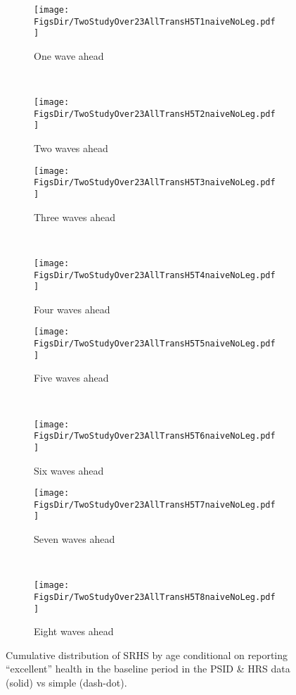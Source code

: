 \documentclass[12pt,pdftex,letterpaper]{article}
\newcommand{\RootDir}{..}
\newcommand{\FigsDir}{\RootDir/Figures}
\begin{document}
\begin{figure}
	\centering
	\begin{subfigure}[b]{0.45\textwidth}
		\texttt{[image: \\FigsDir/TwoStudyOver23AllTransH5T1naiveNoLeg.pdf]}
		\caption{One wave ahead}\label{fig:Naive1AheadExcellent}
	\end{subfigure}
	~
	\begin{subfigure}[b]{0.45\textwidth}
		\texttt{[image: \\FigsDir/TwoStudyOver23AllTransH5T2naiveNoLeg.pdf]}
		\caption{Two waves ahead}\label{fig:Naive2AheadExcellent}
	\end{subfigure}
	
	\begin{subfigure}[b]{0.45\textwidth}
		\texttt{[image: \\FigsDir/TwoStudyOver23AllTransH5T3naiveNoLeg.pdf]}
		\caption{Three waves ahead}\label{fig:Naive3AheadExcellent}
	\end{subfigure}
	~
	\begin{subfigure}[b]{0.45\textwidth}
		\texttt{[image: \\FigsDir/TwoStudyOver23AllTransH5T4naiveNoLeg.pdf]}
		\caption{Four waves ahead}\label{fig:Naive4AheadExcellent}
	\end{subfigure}
	
	\begin{subfigure}[b]{0.45\textwidth}
		\texttt{[image: \\FigsDir/TwoStudyOver23AllTransH5T5naiveNoLeg.pdf]}
		\caption{Five waves ahead}\label{fig:Naive5AheadExcellent}
	\end{subfigure}
	~
	\begin{subfigure}[b]{0.45\textwidth}
		\texttt{[image: \\FigsDir/TwoStudyOver23AllTransH5T6naiveNoLeg.pdf]}
		\caption{Six waves ahead}\label{fig:Naive6AheadExcellent}
	\end{subfigure}
	
	\begin{subfigure}[b]{0.45\textwidth}
		\texttt{[image: \\FigsDir/TwoStudyOver23AllTransH5T7naiveNoLeg.pdf]}
		\caption{Seven waves ahead}\label{fig:Naive7AheadExcellent}
	\end{subfigure}
	~
	\begin{subfigure}[b]{0.45\textwidth}
		\texttt{[image: \\FigsDir/TwoStudyOver23AllTransH5T8naiveNoLeg.pdf]}
		\caption{Eight waves ahead}\label{fig:Naive8AheadExcellent}
	\end{subfigure}
	\caption{Cumulative distribution of SRHS by age conditional on reporting ``excellent'' health in the baseline period in the PSID \& HRS data (solid) vs simple (dash-dot).}\label{fig:NaiveTransEX}
\end{figure}
\end{document}

